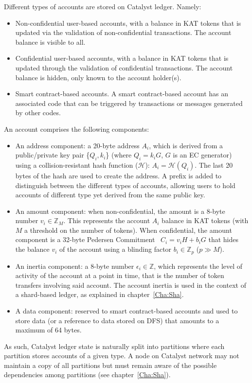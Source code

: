 Different types of accounts are stored on Catalyst ledger. Namely:

\begin{itemize}
\item Non-confidential user-based accounts, with a balance in KAT tokens that is updated via the validation of non-confidential transactions. The account balance is visible to all.
\item Confidential user-based accounts, with a balance in KAT tokens that is updated through the validation of confidential transactions. The account balance is hidden, only known to the account holder(s).
\item Smart contract-based accounts. A smart contract-based account has an associated code that can be triggered by transactions or messages generated by other codes.
\end{itemize}

An account comprises the following components: 

\begin{itemize}
\item An address component: a 20-byte address $A_{i}$, which is derived from a public/private key pair \{$Q_{i},k_{i}$\} (where $Q_i= k_{i}G$, $G$ is an EC generator) using a collision-resistant hash function ($\mathcal{H}$): $A_{i} = \mathcal{H}(Q_{i})$. The last 20 bytes of the hash are used to create the address. A prefix is added to distinguish between the different types of accounts, allowing users to hold accounts of different type yet derived from the same public key. 
\item An amount component: when non-confidential, the amount is a 8-byte number $v_{i} \in \mathbb{Z}_M$. This represents the account $A_{i}$ balance in KAT tokens (with $M$ a threshold on the number of tokens). When confidential, the amount component is a 32-byte Pedersen Commitment~\cite{confidential} $C_{i} = v_{i}H + b_{i}G$ that hides the balance $v_i$ of the account using a blinding factor $b_{i} \in \mathbb{Z}_p$ ($p \gg M$).
\item An inertia component: a 8-byte number $\epsilon_{i} \in \mathbb{Z}$, which represents the level of activity of the account at a point in time, that is the number of token transfers involving said account. The account inertia is used in the context of a shard-based ledger, as explained in chapter~\ref{Cha:Sha}.
\item A data component: reserved to smart contract-based accounts and used to store data (or a reference to data stored on DFS) that amounts to a maximum of 64 bytes. 
\end{itemize}

As such, Catalyst ledger state is naturally split into partitions where each partition stores accounts of a given type. A node on Catalyst network may not maintain a copy of all partitions but must remain aware of the possible dependencies among partitions (see chapter~\ref{Cha:Sha}).\\